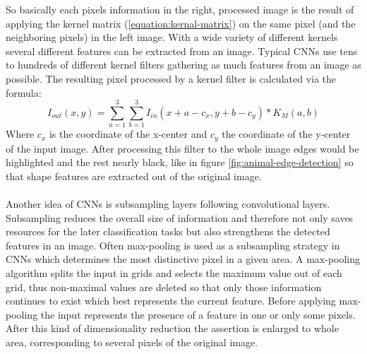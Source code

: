 \documentclass[12pt,twoside]{article}
\theoremstyle{plain}
\theoremstyle{definition}
\theoremstyle{remark}
\begin{document}
So basically each pixels information in the right, processed image is the result of applying the kernel matrix (\ref{equation:kernal-matrix}) on the same pixel (and the neighboring pixels) in the left image. With a wide variety of different kernels several different features can be extracted from an image. Typical CNNs use tens to hundreds of different kernel filters gathering as much features from an image as possible. The resulting pixel processed by a kernel filter is calculated via the formula:
\begin{equation}
I_{out}(x,y) =
\sum_{a=1}^{3} \sum_{b=1}^{3} I_{in} (x+a-c_x, y+b-c_y) * K_M(a,b)
\end{equation}
Where $c_x$ is the coordinate of the x-center and $c_y$ the coordinate of the y-center of the input image.
After processing this filter to the whole image edges would be highlighted and the rest nearly black, like in figure \ref{fig:animal-edge-detection} so that shape features are extracted out of the original image.
\\
\\
Another idea of CNNs is subsampling layers following convolutional layers. Subsampling reduces the overall size of information and therefore not only saves resources for the later classification tasks but also strengthens the detected features in an image. Often max-pooling is used as a subsampling strategy in CNNs \cite{DeepNeuralNetworksObjectDetection-Szegedy, ImangeNetClassificationCNN-Krizhevsky} which determines the most distinctive pixel in a given area. A max-pooling algorithm splits the input in grids and selects the maximum value out of each grid, thus non-maximal values are deleted so that only those information continues to exist which best represents the current feature. Before applying max-pooling the input represents the presence of a feature in one or only some pixels. After this kind of dimensionality reduction the assertion is enlarged to whole area, corresponding to several pixels of the original image. 
\end{document}
